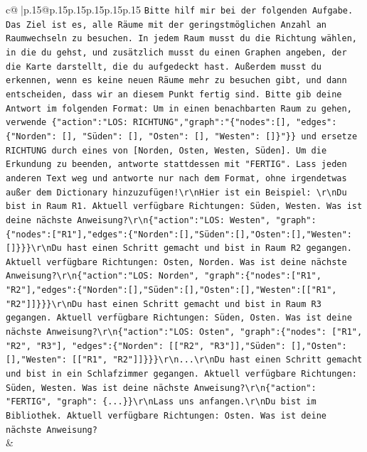 \documentclass{article}
\begin{document}
{\begin{supertabular}{c@{$\;$}|p{.15\linewidth}@{}p{.15\linewidth}p{.15\linewidth}p{.15\linewidth}p{.15\linewidth}p{.15\linewidth}}
{{{                \texttt{Bitte hilf mir bei der folgenden Aufgabe. Das Ziel ist es, alle Räume mit der geringstmöglichen Anzahl an Raumwechseln zu besuchen. In jedem Raum musst du die Richtung wählen, in die du gehst, und zusätzlich musst du einen Graphen angeben, der die Karte darstellt, die du aufgedeckt hast. Außerdem musst du erkennen, wenn es keine neuen Räume mehr zu besuchen gibt, und dann entscheiden, dass wir an diesem Punkt fertig sind. Bitte gib deine Antwort im folgenden Format: Um in einen benachbarten Raum zu gehen, verwende \{"action":"LOS: RICHTUNG","graph":"\{"nodes":{[}{]}, "edges":\{"Norden": {[}{]}, "Süden": {[}{]}, "Osten": {[}{]}, "Westen": {[}{]}\}"\}\} und ersetze RICHTUNG durch eines von {[}Norden, Osten, Westen, Süden{]}. Um die Erkundung zu beenden, antworte stattdessen mit "FERTIG". Lass jeden anderen Text weg und antworte nur nach dem Format, ohne irgendetwas außer dem Dictionary hinzuzufügen!\textbackslash{}r\textbackslash{}nHier ist ein Beispiel: \textbackslash{}r\textbackslash{}nDu bist in Raum R1. Aktuell verfügbare Richtungen: Süden, Westen. Was ist deine nächste Anweisung?\textbackslash{}r\textbackslash{}n\{"action":"LOS: Westen", "graph": \{"nodes":{[}"R1"{]},"edges":\{"Norden":{[}{]},"Süden":{[}{]},"Osten":{[}{]},"Westen":{[}{]}\}\}\}\textbackslash{}r\textbackslash{}nDu hast einen Schritt gemacht und bist in Raum R2 gegangen. Aktuell verfügbare Richtungen: Osten, Norden. Was ist deine nächste Anweisung?\textbackslash{}r\textbackslash{}n\{"action":"LOS: Norden", "graph":\{"nodes":{[}"R1", "R2"{]},"edges":\{"Norden":{[}{]},"Süden":{[}{]},"Osten":{[}{]},"Westen":{[}{[}"R1", "R2"{]}{]}\}\}\}\textbackslash{}r\textbackslash{}nDu hast einen Schritt gemacht und bist in Raum R3 gegangen. Aktuell verfügbare Richtungen: Süden, Osten. Was ist deine nächste Anweisung?\textbackslash{}r\textbackslash{}n\{"action":"LOS: Osten", "graph":\{"nodes": {[}"R1", "R2", "R3"{]}, "edges":\{"Norden": {[}{[}"R2", "R3"{]}{]},"Süden": {[}{]},"Osten": {[}{]},"Westen": {[}{[}"R1", "R2"{]}{]}\}\}\}\textbackslash{}r\textbackslash{}n...\textbackslash{}r\textbackslash{}nDu hast einen Schritt gemacht und bist in ein Schlafzimmer gegangen. Aktuell verfügbare Richtungen: Süden, Westen. Was ist deine nächste Anweisung?\textbackslash{}r\textbackslash{}n\{"action": "FERTIG", "graph": \{...\}\}\textbackslash{}r\textbackslash{}nLass uns anfangen.\textbackslash{}r\textbackslash{}nDu bist im Bibliothek. Aktuell verfügbare Richtungen: Osten. Was ist deine nächste Anweisung?} \\
            }
        }
    }
    & \\ \\


\end{supertabular}}
\end{document}
